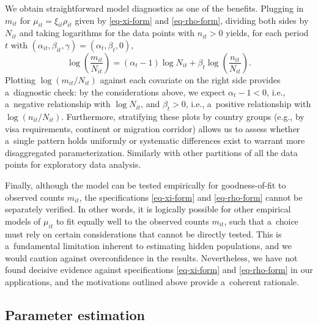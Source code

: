 We obtain straightforward model diagnostics as one of the benefits. Plugging in $m_{it}$ for $\mu_{it} = \xi_{it} \rho_{it}$ given by \eqref{eq-xi-form} and \eqref{eq-rho-form}, dividing both sides by $N_{it}$ and taking logarithms for the data points with $n_{it} > 0$ yields, for each period $t$ with $(\alpha_{it}, \beta_{it}, \gamma) = (\alpha_t, \beta_t, 0)$, 
\begin{equation}\label{eq-diagnostic-model}
\log\left(\frac{m_{it}}{N_{it}}\right) = (\alpha_t - 1) \log N_{it} + \beta_t \log\left(\frac{n_{it}}{N_{it}}\right).
\end{equation}
Plotting $\log(m_{it}/N_{it})$ against each covariate on the right side provides a~diagnostic check: by the considerations above, we expect $\alpha_t - 1 < 0$, i.e., a~negative relationship with $\log N_{it}$, and $\beta_t > 0$, i.e., a~positive relationship with $\log(n_{it}/N_{it})$. Furthermore, stratifying these plots by country groups (e.g., by visa requirements, continent or migration corridor) allows us to assess whether a~single pattern holds uniformly or systematic differences exist to warrant more disaggregated parameterization. Similarly with other partitions of all the data points for exploratory data analysis. 

Finally, although the model can be tested empirically for goodness-of-fit to observed counts $m_{it}$, the specifications \eqref{eq-xi-form} and \eqref{eq-rho-form} cannot be separately verified. In other words, it is logically possible for other empirical models of $\mu_{it}$ to fit equally well to the observed counts $m_{it}$, such that a~choice must rely on certain considerations that cannot be directly tested. This is a~fundamental limitation inherent to estimating hidden populations, and we would caution against overconfidence in the results. Nevertheless, we have not found decisive evidence against specifications \eqref{eq-xi-form} and \eqref{eq-rho-form} in our applications, and the motivations outlined above provide a~coherent rationale.


\subsection{Parameter estimation}\label{estimation}
 

